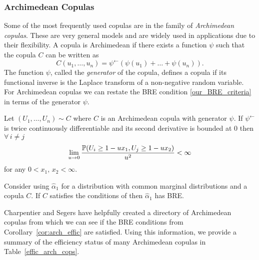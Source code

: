\subsubsection{Archimedean Copulas}

Some of the most frequently used copulas are in the family of \emph{Archimedean copulas}. These are very general models and  are widely used in applications due to their flexibility. A copula is Archimedean if there exists a function $\psi$ such that the copula $C$ can be written as
\begin{equation*}
	C(u_1,\dots,u_n)=\psi^{\leftarrow}(\psi(u_1)+\dots+\psi(u_n)).
\end{equation*}
The function $\psi$, called the \emph{generator} of the copula, defines a copula if its functional inverse is the Laplace transform of a non-negative random variable.
For Archimedean copulas we can restate the BRE condition \eqref{our_BRE_criteria} in terms of the generator $\psi$.

\begin{Theorem} \label{arch_cop_effic}
Let $(U_1, \dots, U_n) \sim C$ where $C$ is an Archimedean copula with generator $\psi$. If $\psi^{\leftarrow}$ is twice continuously differentiable and its second derivative is bounded at 0 then $\forall \, i \not= j$
\[ \lim_{u \to 0} \frac{\operatorname{{\mathbb P}}(U_i \geq 1 - u x_1, U_j \geq 1 - u x_2)}{u^2} < \infty  \]
for any $0 < x_1,\, x_2 < \infty$.
\end{Theorem}

\begin{Corollary} \label{cor:arch_effic}
Consider using $\hat{\alpha}_1$ for a distribution with common marginal distributions and a copula $C$. If $C$ satisfies the conditions of  then $\hat{\alpha}_1$ has BRE.
\end{Corollary}

Charpentier and Segers \cite{charpentier2009tails} have helpfully created a directory of Archimedean copulas from which we can see if the BRE conditions from Corollary~\ref{cor:arch_effic} are satisfied. Using this information, we provide a summary of the efficiency status of many Archimedean copulas in Table~\ref{effic_arch_cops}.


